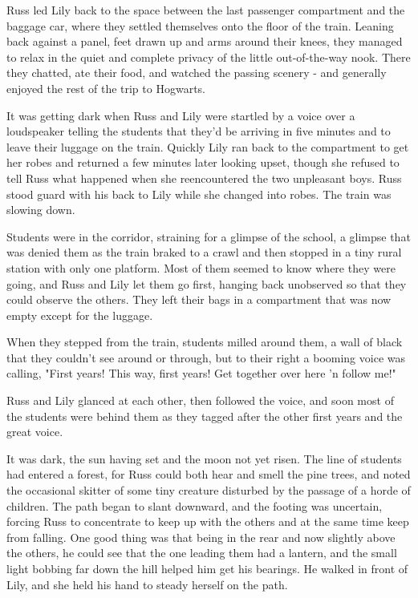 \documentclass[a4paper,11pt]{article}
\begin{document}
Russ led Lily back to the space between the last passenger compartment and the baggage car, where they settled themselves onto the floor of the train. Leaning back against a panel, feet drawn up and arms around their knees, they managed to relax in the quiet and complete privacy of the little out-of-the-way nook. There they chatted, ate their food, and watched the passing scenery - and generally enjoyed the rest of the trip to Hogwarts.

It was getting dark when Russ and Lily were startled by a voice over a loudspeaker telling the students that they'd be arriving in five minutes and to leave their luggage on the train. Quickly Lily ran back to the compartment to get her robes and returned a few minutes later looking upset, though she refused to tell Russ what happened when she reencountered the two unpleasant boys. Russ stood guard with his back to Lily while she changed into robes. The train was slowing down.

Students were in the corridor, straining for a glimpse of the school, a glimpse that was denied them as the train braked to a crawl and then stopped in a tiny rural station with only one platform. Most of them seemed to know where they were going, and Russ and Lily let them go first, hanging back unobserved so that they could observe the others. They left their bags in a compartment that was now empty except for the luggage.

When they stepped from the train, students milled around them, a wall of black that they couldn't see around or through, but to their right a booming voice was calling, "First years! This way, first years! Get together over here 'n follow me!"

Russ and Lily glanced at each other, then followed the voice, and soon most of the students were behind them as they tagged after the other first years and the great voice.

It was dark, the sun having set and the moon not yet risen. The line of students had entered a forest, for Russ could both hear and smell the pine trees, and noted the occasional skitter of some tiny creature disturbed by the passage of a horde of children. The path began to slant downward, and the footing was uncertain, forcing Russ to concentrate to keep up with the others and at the same time keep from falling. One good thing was that being in the rear and now slightly above the others, he could see that the one leading them had a lantern, and the small light bobbing far down the hill helped him get his bearings. He walked in front of Lily, and she held his hand to steady herself on the path.
\end{document}
